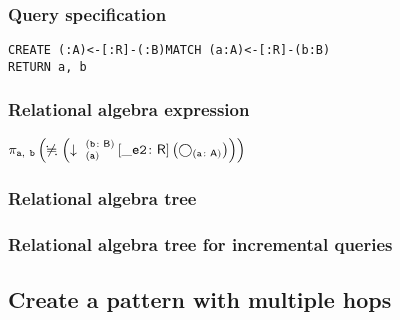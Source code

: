 \subsubsection*{Query specification}

\begin{lstlisting}
CREATE (:A)<-[:R]-(:B)MATCH (a:A)<-[:R]-(b:B)
RETURN a, b
\end{lstlisting}

\subsubsection*{Relational algebra expression}

$\projection{\var{a},~\var{b}} \left(\alldifferent{} \left(\expandin{a}{b}{B}{\_e2}{R} \left(\getvertices{a}{A}\right)\right)\right)$

\subsubsection*{Relational algebra tree}


\subsubsection*{Relational algebra tree for incremental queries}


\subsection{Create a pattern with multiple hops}

